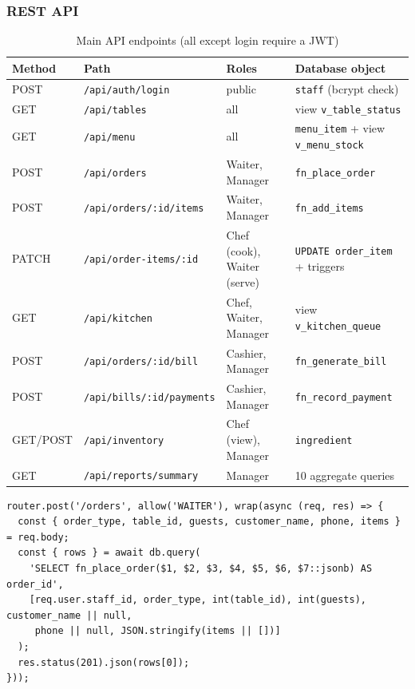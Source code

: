 \documentclass[11pt,a4paper]{report}
\begin{document}
\subsubsection{REST API}
\begin{table}[H]
    \centering
    \caption{Main API endpoints (all except login require a JWT)}
    \footnotesize
    \begin{tabularx}{\textwidth}{|l|l|l|Y|}
        \hline
        \textbf{Method} & \textbf{Path} & \textbf{Roles} & \textbf{Database object} \\ \hline
        POST & \texttt{/api/auth/login} & public & \texttt{staff} (bcrypt check) \\ \hline
        GET & \texttt{/api/tables} & all & view \texttt{v\_table\_status} \\ \hline
        GET & \texttt{/api/menu} & all & \texttt{menu\_item} + view \texttt{v\_menu\_stock} \\ \hline
        POST & \texttt{/api/orders} & Waiter, Manager & \texttt{fn\_place\_order} \\ \hline
        POST & \texttt{/api/orders/:id/items} & Waiter, Manager & \texttt{fn\_add\_items} \\ \hline
        PATCH & \texttt{/api/order-items/:id} & Chef (cook), Waiter (serve) & \texttt{UPDATE order\_item} + triggers \\ \hline
        GET & \texttt{/api/kitchen} & Chef, Waiter, Manager & view \texttt{v\_kitchen\_queue} \\ \hline
        POST & \texttt{/api/orders/:id/bill} & Cashier, Manager & \texttt{fn\_generate\_bill} \\ \hline
        POST & \texttt{/api/bills/:id/payments} & Cashier, Manager & \texttt{fn\_record\_payment} \\ \hline
        GET/POST & \texttt{/api/inventory} & Chef (view), Manager & \texttt{ingredient} \\ \hline
        GET & \texttt{/api/reports/summary} & Manager & 10 aggregate queries \\ \hline
    \end{tabularx}
\end{table}

\begin{lstlisting}[style=js, caption={A route: the API only validates input and calls the database function}]
router.post('/orders', allow('WAITER'), wrap(async (req, res) => {
  const { order_type, table_id, guests, customer_name, phone, items } = req.body;
  const { rows } = await db.query(
    'SELECT fn_place_order($1, $2, $3, $4, $5, $6, $7::jsonb) AS order_id',
    [req.user.staff_id, order_type, int(table_id), int(guests), customer_name || null,
     phone || null, JSON.stringify(items || [])]
  );
  res.status(201).json(rows[0]);
}));
\end{lstlisting}
\end{document}
